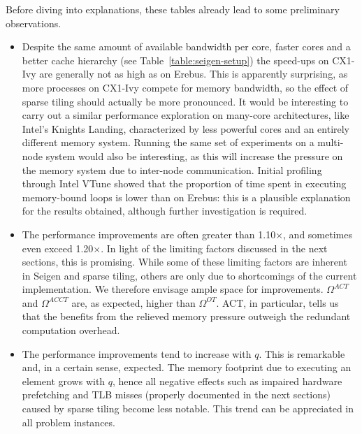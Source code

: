Before diving into explanations, these tables already lead to some preliminary observations.
\begin{itemize}
\item Despite the same amount of available bandwidth per core, faster cores and a better cache hierarchy (see Table~\ref{table:seigen-setup}) the speed-ups on CX1-Ivy are generally not as high as on Erebus. This is apparently surprising, as more processes on CX1-Ivy compete for memory bandwidth, so the effect of sparse tiling should actually be more pronounced. It would be interesting to carry out a similar performance exploration on many-core architectures, like Intel's Knights Landing, characterized by less powerful cores and an entirely different memory system. Running the same set of experiments on a multi-node system would also be interesting, as this will increase the pressure on the memory system due to inter-node communication. Initial profiling through Intel VTune showed that the proportion of time spent in executing memory-bound loops is lower than on Erebus: this is a plausible explanation for the results obtained, although further investigation is required. 

\item The performance improvements are often greater than 1.10$\times$, and sometimes even exceed 1.20$\times$. In light of the limiting factors discussed in the next sections, this is promising. While some of these limiting factors are inherent in Seigen and sparse tiling, others are only due to shortcomings of the current implementation. We therefore envisage ample space for improvements. $\Omega^{ACT}$ and $\Omega^{ACCT}$ are, as expected, higher than $\Omega^{OT}$. ACT, in particular, tells us that the benefits from the relieved memory pressure outweigh the redundant computation overhead.

\item The performance improvements tend to increase with $q$. This is remarkable and, in a certain sense, expected. The memory footprint due to executing an element grows with $q$, hence all negative effects such as impaired hardware prefetching and TLB misses (properly documented in the next sections) caused by sparse tiling become less notable. This trend can be appreciated in all problem instances. 
\end{itemize}




